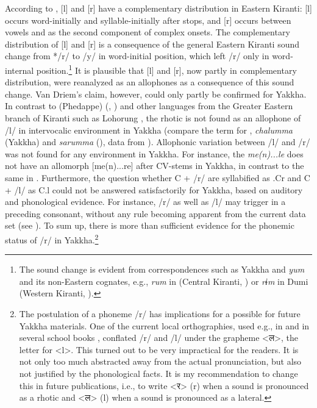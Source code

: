 According to  \cite{Driem1990The-fall}, [l] and [r] have a complementary distribution in Eastern Kiranti: [l] occurs word-initially and syllable-initially after stops, and [r] occurs between vowels and as the second component of complex onsets. The complementary distribution of [l] and [r] is a consequence of the general Eastern Kiranti sound change from */r/ to /y/ in word-initial position, which left /r/ only in word-internal position.\footnote{The sound change is evident from correspondences such as Yakkha and  \emph{yum}  and its non-Eastern cognates, e.g., \emph{rum} in  (Central Kiranti, \citealt[393]{Bickeletal2009Puma}) or \emph{rɨm} in Dumi (Western Kiranti, \citealt[412]{Driem1993A-grammar}).} It is plausible that [l] and [r], now partly in complementary distribution, were reanalyzed as an allophones as a consequence of this sound change.  Van Driem's claim, however, could only partly be confirmed for Yakkha. In contrast to (Phedappe)  (\citealt{Driem1987A-grammar}, \citealt[688]{Schieringetal2010The-prosodic}) and other languages from the Greater Eastern branch of Kiranti such as Lohorung \citep[85]{Driem1990The-fall}, the rhotic is not found as an allophone of /l/ in intervocalic environment in Yakkha (compare the term for , \emph{chalumma} (Yakkha) and \emph{sarumma} (),  data from \citet[131]{Driem1985_LimbuKin}). Allophonic variation between /l/ and /r/ was not found for any environment in Yakkha. For instance, the  \emph{me(n)...le} does not have an allomorph [me(n)...re] after CV-stems in Yakkha, in contrast to the same  in . Furthermore, the question whether C + /r/ are syllabified as .Cr and C + /l/ as C.l could not be answered satisfactorily for Yakkha, based on auditory and phonological evidence. For instance, /r/ as well as /l/ may trigger  in a preceding consonant, without any rule becoming apparent from the current data set (see ). To sum up, there is more than sufficient evidence for the phonemic status of /r/ in Yakkha.\footnote{The postulation of a phoneme /r/ has implications for a possible  for future Yakkha materials. One of the current local orthographies, used e.g., in \citet{Kongren2007Yakkha} and in several school books \citep{Jimi2009Engka-Yakkha}, conflated /r/ and /l/ under the grapheme <{\Deva ल}>, the  letter for <l>. This turned out to be very impractical for the readers. It is not only too much abstracted away from the actual pronunciation, but also not justified by the phonological facts. It is my recommendation to change this in future publications, i.e., to write <{\Deva र}> (r) when a sound is pronounced as a rhotic and <{\Deva ल}> (l) when a sound is pronounced as a lateral.}



